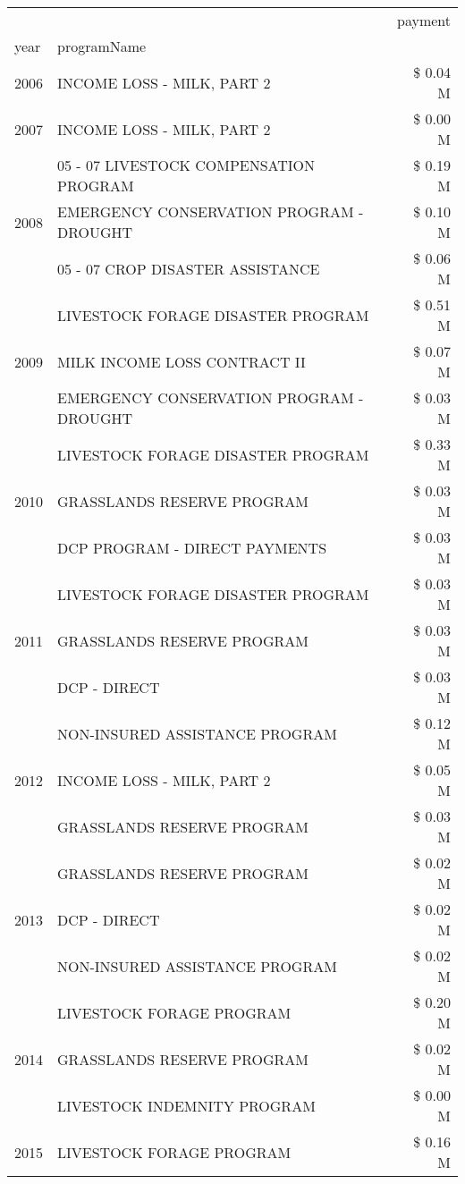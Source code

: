 \begin{tabular}{llr}
\toprule
 &  & payment \\
year & programName &  \\
\midrule
2006 & INCOME LOSS - MILK, PART 2 & \$ 0.04 M \\
\cline{1-3}
2007 & INCOME LOSS - MILK, PART 2 & \$ 0.00 M \\
\cline{1-3}
\multirow[t]{3}{*}{2008} & 05 - 07 LIVESTOCK COMPENSATION PROGRAM & \$ 0.19 M \\
 & EMERGENCY CONSERVATION PROGRAM - DROUGHT & \$ 0.10 M \\
 & 05 - 07 CROP DISASTER ASSISTANCE & \$ 0.06 M \\
\cline{1-3}
\multirow[t]{3}{*}{2009} & LIVESTOCK FORAGE DISASTER  PROGRAM & \$ 0.51 M \\
 & MILK INCOME LOSS CONTRACT II & \$ 0.07 M \\
 & EMERGENCY CONSERVATION PROGRAM - DROUGHT & \$ 0.03 M \\
\cline{1-3}
\multirow[t]{3}{*}{2010} & LIVESTOCK FORAGE DISASTER  PROGRAM & \$ 0.33 M \\
 & GRASSLANDS RESERVE PROGRAM & \$ 0.03 M \\
 & DCP PROGRAM - DIRECT PAYMENTS & \$ 0.03 M \\
\cline{1-3}
\multirow[t]{3}{*}{2011} & LIVESTOCK FORAGE DISASTER PROGRAM & \$ 0.03 M \\
 & GRASSLANDS RESERVE PROGRAM & \$ 0.03 M \\
 & DCP - DIRECT & \$ 0.03 M \\
\cline{1-3}
\multirow[t]{3}{*}{2012} & NON-INSURED ASSISTANCE PROGRAM & \$ 0.12 M \\
 & INCOME LOSS - MILK, PART 2 & \$ 0.05 M \\
 & GRASSLANDS RESERVE PROGRAM & \$ 0.03 M \\
\cline{1-3}
\multirow[t]{3}{*}{2013} & GRASSLANDS RESERVE PROGRAM & \$ 0.02 M \\
 & DCP - DIRECT & \$ 0.02 M \\
 & NON-INSURED ASSISTANCE PROGRAM & \$ 0.02 M \\
\cline{1-3}
\multirow[t]{3}{*}{2014} & LIVESTOCK FORAGE PROGRAM & \$ 0.20 M \\
 & GRASSLANDS RESERVE PROGRAM & \$ 0.02 M \\
 & LIVESTOCK INDEMNITY PROGRAM & \$ 0.00 M \\
\cline{1-3}
\multirow[t]{3}{*}{2015} & LIVESTOCK FORAGE PROGRAM & \$ 0.16 M \\

\end{tabular}

